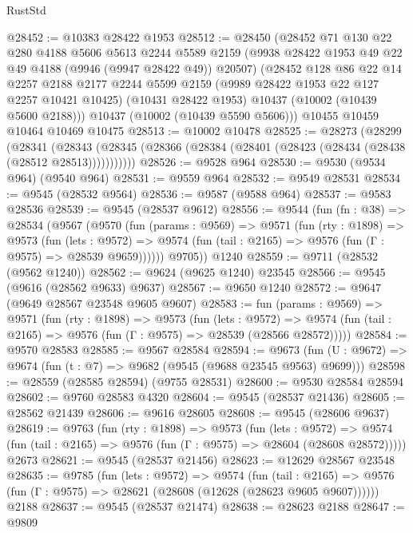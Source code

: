 \begin{lexlean}{RustStd}
\begin{coremodule}
@28452 := @10383 @28422 @1953
@28512 := @28450
    (@28452
      @71
      @130
      @22
      @280
      @4188
      @5606
      @5613
      @2244
      @5589
      @2159
      (@9938 @28422 @1953 @49 @22 @49 @4188 (@9946 (@9947 @28422 @49)) @20507)
      (@28452
        @128
        @86
        @22
        @14
        @2257
        @2188
        @2177
        @2244
        @5599
        @2159
        (@9989 @28422 @1953 @22 @127 @2257 @10421 @10425)
        (@10431 @28422 @1953)
        @10437
        (@10002 (@10439 @5600 @2188)))
      @10437
      (@10002 (@10439 @5590 @5606)))
    @10455
    @10459
    @10464
    @10469
    @10475
@28513 := @10002 @10478
@28525 := @28273
    (@28299
      (@28341
        (@28343 (@28345 (@28366 (@28384 (@28401 (@28423 (@28434 (@28438 (@28512 @28513)))))))))))
@28526 := @9528 @964
@28530 := @9530 (@9534 @964) (@9540 @964)
@28531 := @9559 @964
@28532 := @9549 @28531
@28534 := @9545 (@28532 @9564)
@28536 := @9587 (@9588 @964)
@28537 := @9583 @28536
@28539 := @9545 (@28537 @9612)
@28556 := @9544
    (fun (fn : @38) =>
    @28534
      (@9567
        (@9570
          (fun (params : @9569) =>
          @9571
            (fun (rty : @1898) =>
            @9573
              (fun (lets : @9572) =>
              @9574 (fun (tail : @2165) => @9576 (fun (Γ : @9575) => @28539 @9659))))))
        @9705))
    @1240
@28559 := @9711 (@28532 (@9562 @1240))
@28562 := @9624 (@9625 @1240) @23545
@28566 := @9545 (@9616 (@28562 @9633) @9637)
@28567 := @9650 @1240
@28572 := @9647 (@9649 @28567 @23548 @9605 @9607)
@28583 := fun (params : @9569) =>
  @9571
    (fun (rty : @1898) =>
    @9573
      (fun (lets : @9572) =>
      @9574 (fun (tail : @2165) => @9576 (fun (Γ : @9575) => @28539 (@28566 @28572)))))
@28584 := @9570 @28583
@28585 := @9567 @28584
@28594 := @9673
    (fun (U : @9672) => @9674 (fun (t : @7) => @9682 (@9545 (@9688 @23545 @9563) @9699)))
@28598 := @28559 (@28585 @28594) (@9755 @28531)
@28600 := @9530 @28584 @28594
@28602 := @9760 @28583 @4320
@28604 := @9545 (@28537 @21436)
@28605 := @28562 @21439
@28606 := @9616 @28605
@28608 := @9545 (@28606 @9637)
@28619 := @9763
    (fun (rty : @1898) =>
    @9573
      (fun (lets : @9572) =>
      @9574 (fun (tail : @2165) => @9576 (fun (Γ : @9575) => @28604 (@28608 @28572)))))
    @2673
@28621 := @9545 (@28537 @21456)
@28623 := @12629 @28567 @23548
@28635 := @9785
    (fun (lets : @9572) =>
    @9574
      (fun (tail : @2165) =>
      @9576 (fun (Γ : @9575) => @28621 (@28608 (@12628 (@28623 @9605 @9607))))))
    @2188
@28637 := @9545 (@28537 @21474)
@28638 := @28623 @2188
@28647 := @9809

\end{coremodule}
\end{lexlean}
